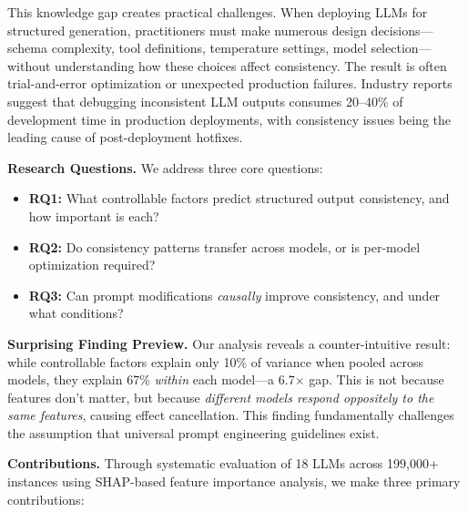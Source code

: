 \documentclass[sigconf,anonymous,review]{acmart}
\begin{document}
This knowledge gap creates practical challenges. When deploying LLMs for structured generation, practitioners must make numerous design decisions---schema complexity, tool definitions, temperature settings, model selection---without understanding how these choices affect consistency. The result is often trial-and-error optimization or unexpected production failures. Industry reports suggest that debugging inconsistent LLM outputs consumes 20--40\% of development time in production deployments, with consistency issues being the leading cause of post-deployment hotfixes.

\textbf{Research Questions.} We address three core questions:
\begin{itemize}
    \item \textbf{RQ1:} What controllable factors predict structured output consistency, and how important is each?
    \item \textbf{RQ2:} Do consistency patterns transfer across models, or is per-model optimization required?
    \item \textbf{RQ3:} Can prompt modifications \textit{causally} improve consistency, and under what conditions?
\end{itemize}

\textbf{Surprising Finding Preview.} Our analysis reveals a counter-intuitive result: while controllable factors explain only 10\% of variance when pooled across models, they explain 67\% \textit{within} each model---a 6.7$\times$ gap. This is not because features don't matter, but because \textit{different models respond oppositely to the same features}, causing effect cancellation. This finding fundamentally challenges the assumption that universal prompt engineering guidelines exist.

\textbf{Contributions.} Through systematic evaluation of 18 LLMs across 199,000+ instances using SHAP-based feature importance analysis, we make three primary contributions:
\end{document}
